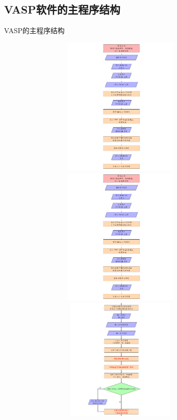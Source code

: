 \subsection{\rm{VASP}软件的主程序结构}
\begin{frame}[allowframebreaks]{\textrm{VASP}的主程序结构}
\begin{figure}[h!]
\vskip -10pt
\centering
\includegraphics[height=2.65in,width=4.0in,viewport=0 360 562 720,clip]{Figures/VASP_main_Flow-1.png}
\includegraphics[height=2.65in,width=4.0in,viewport=0 0 562 360,clip]{Figures/VASP_main_Flow-1.png}
\includegraphics[height=2.35in,width=4.0in,viewport=0 370 562 680,clip]{Figures/VASP_main_Flow-2.png}

\end{figure}
\end{frame}
